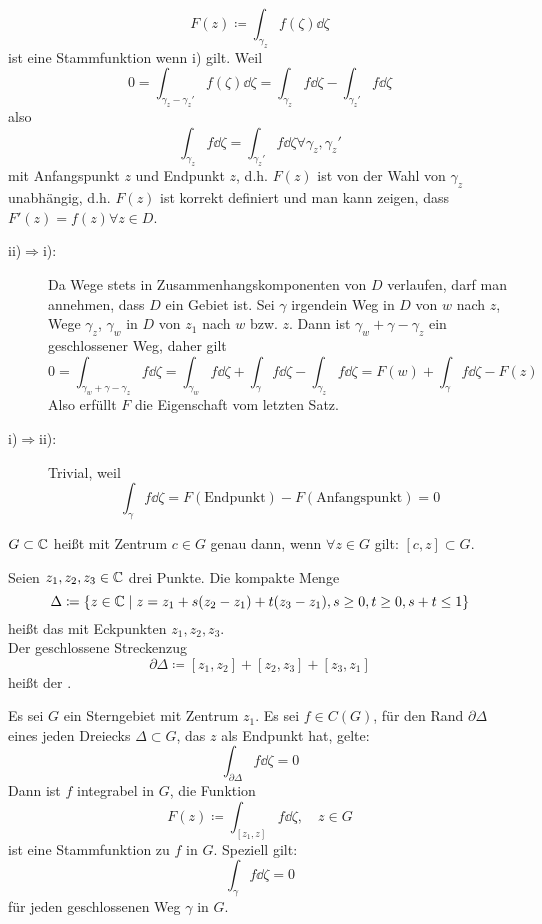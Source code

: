 \begin{bemerkung*}
	\[ F(z)\coloneqq\int_{\gamma_z}^{} f(\zeta)\dd\zeta \]
	ist eine Stammfunktion wenn i) gilt. Weil
	\[ 0=\int_{\gamma_z-\gamma_z'}^{}f(\zeta)\dd\zeta=\int_{\gamma_z}^{} f\dd\zeta-\int_{\gamma_z'}^{} f\dd\zeta  \]
	also
	\[ \int_{\gamma_z}^{}f\dd\zeta=\int_{\gamma_z'}^{}f\dd\zeta\forall\gamma_z,\gamma_z' \] mit Anfangspunkt $ z $ und Endpunkt $ z $, d.h. $ F(z) $ ist von der Wahl von $ \gamma_z $ unabh\"angig, d.h. $ F(z) $ ist korrekt definiert und man kann zeigen, dass $ F'(z)=f(z)\forall z\in D $.
\end{bemerkung*}
\begin{beweis}
	\begin{description}
	\item[ii)$ \Rightarrow $i):] Da Wege stets in Zusammenhangskomponenten von $ D $ verlaufen, darf man annehmen, dass $ D $ ein Gebiet ist. Sei $ \gamma $ irgendein Weg in $ D $ von $ w $ nach $ z $, Wege $ \gamma_z $, $ \gamma_w $ in $ D $ von $ z_1 $ nach $ w $ bzw. $ z $. Dann ist $ \gamma_w+\gamma-\gamma_z $ ein geschlossener Weg, daher gilt
	\[ 0=\int_{\gamma_w+\gamma-\gamma_z}^{} f\dd\zeta=\int_{\gamma_w}^{} f\dd\zeta+\int_{\gamma}^{} f\dd\zeta-\int_{\gamma_z}^{} f\dd\zeta=F(w)+\int_{\gamma}^{} f\dd\zeta-F(z) \]
	Also erf\"ullt $ F $ die Eigenschaft vom letzten Satz.
	\item[i)$ \Rightarrow $ii):] Trivial, weil
	\[ \int_{\gamma}^{} f\dd\zeta=F(\text{Endpunkt})-F(\text{Anfangspunkt})=0 \]
	\end{description}
\end{beweis}
\begin{definition}
	$ G \subset \mathbb{C} $ hei\ss t  mit Zentrum $ c\in G $ genau dann, wenn $ \forall z\in G $ gilt: $ [c,z]\subset G $.
\end{definition}
\newpage
\begin{definition}
	Seien $ z_1,z_2,z_3\in\mathbb{C} $ drei Punkte. Die kompakte Menge \[ \Delta\coloneqq\lbrace z\in\mathbb{C}\mid z=z_1+s(z_2-z_1)+t(z_3-z_1),s\geq 0,t\geq 0, s+t\leq 1\rbrace \]
	hei\ss t das  mit Eckpunkten $ z_1,z_2,z_3 $.\\
	Der geschlossene Streckenzug
	\[ \partial\Delta\coloneqq[z_1,z_2]+[z_2,z_3]+[z_3,z_1] \]
	hei\ss t der . 
\end{definition}
\begin{satz}
	Es sei $ G $ ein Sterngebiet mit Zentrum $ z_1 $. Es sei $ f\in C(G) $, f\"ur den Rand $ \partial\Delta $ eines jeden Dreiecks $ \Delta\subset G $, das $ z $ als Endpunkt hat, gelte:
	\[ \int_{\partial\Delta}^{} f\dd\zeta = 0 \]
	Dann ist $ f $ integrabel in $ G $, die Funktion
	\[ F(z)\coloneqq\int_{[z_1,z]}^{} f\dd\zeta,\quad z\in G \]
	ist eine Stammfunktion zu $ f $ in $ G $. Speziell gilt:
	\[ \int_{\gamma}^{} f\dd\zeta=0 \]
	f\"ur jeden geschlossenen Weg $ \gamma $ in $ G $.
\end{satz}
